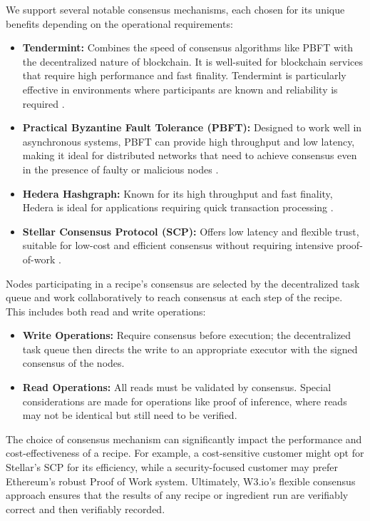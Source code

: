 \documentclass[11pt]{article}
\begin{document}
We support several notable consensus mechanisms, each chosen for its unique benefits depending on the operational requirements:
\begin{itemize}
    \item \textbf{Tendermint:} Combines the speed of consensus algorithms like PBFT with the decentralized nature of blockchain. It is well-suited for blockchain services that require high performance and fast finality. Tendermint is particularly effective in environments where participants are known and reliability is required \parencite{kwon2014tendermint}.
    \item \textbf{Practical Byzantine Fault Tolerance (PBFT):} Designed to work well in asynchronous systems, PBFT can provide high throughput and low latency, making it ideal for distributed networks that need to achieve consensus even in the presence of faulty or malicious nodes \parencite{castro1999practical}.
    \item \textbf{Hedera Hashgraph:} Known for its high throughput and fast finality, Hedera is ideal for applications requiring quick transaction processing \parencite{baird2016swirlds}.
    \item \textbf{Stellar Consensus Protocol (SCP):} Offers low latency and flexible trust, suitable for low-cost and efficient consensus without requiring intensive proof-of-work \parencite{mazieres2015stellar}.
\end{itemize}

Nodes participating in a recipe's consensus are selected by the decentralized task queue and work collaboratively to reach consensus at each step of the recipe. This includes both read and write operations:
\begin{itemize}
    \item \textbf{Write Operations:} Require consensus before execution; the decentralized task queue then directs the write to an appropriate executor with the signed consensus of the nodes.
    \item \textbf{Read Operations:} All reads must be validated by consensus. Special considerations are made for operations like proof of inference, where reads may not be identical but still need to be verified.
\end{itemize}

The choice of consensus mechanism can significantly impact the performance and cost-effectiveness of a recipe. For example, a cost-sensitive customer might opt for Stellar's SCP for its efficiency, while a security-focused customer may prefer Ethereum's robust Proof of Work system. Ultimately, W3.io's flexible consensus approach ensures that the results of any recipe or ingredient run are verifiably correct and then verifiably recorded.
\end{document}
